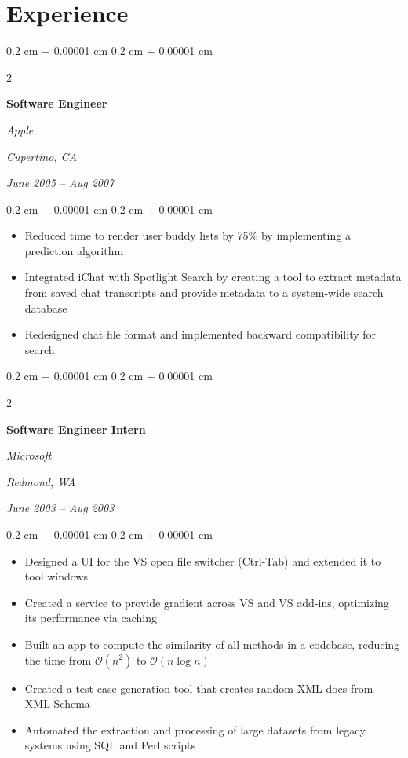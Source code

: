 \documentclass[10pt, letterpaper]{article}
\newenvironment{highlights}{
    \begin{itemize}[
        topsep=0.10 cm,
        parsep=0.10 cm,
        partopsep=0pt,
        itemsep=0pt,
        leftmargin=0.4 cm + 10pt
    ]
}{
    \end{itemize}
} %
\newenvironment{onecolentry}{
    \begin{adjustwidth}{
        0.2 cm + 0.00001 cm
    }{
        0.2 cm + 0.00001 cm
    }
}{
    \end{adjustwidth}
} %
\newenvironment{twocolentry}[2][]{
    \onecolentry
    \def\secondColumn{#2}
    \setcolumnwidth{\fill, 4.5 cm}
    \begin{paracol}{2}
}{
    \switchcolumn \raggedleft \secondColumn
    \end{paracol}
    \endonecolentry
} %
\begin{document}
    \section{Experience}




        \begin{twocolentry}{
        \textit{Cupertino, CA}

        \textit{June 2005 – Aug 2007}}
            \textbf{Software Engineer}

            \textit{Apple}
        \end{twocolentry}

        \vspace{0.10 cm}
        \begin{onecolentry}
            \begin{highlights}
                \item Reduced time to render user buddy lists by 75\% by implementing a prediction algorithm
                \item Integrated iChat with Spotlight Search by creating a tool to extract metadata from saved chat transcripts and provide metadata to a system-wide search database
                \item Redesigned chat file format and implemented backward compatibility for search
            \end{highlights}
        \end{onecolentry}


        \vspace{0.2 cm}

        \begin{twocolentry}{
        \textit{Redmond, WA}

        \textit{June 2003 – Aug 2003}}
            \textbf{Software Engineer Intern}

            \textit{Microsoft}
        \end{twocolentry}

        \vspace{0.10 cm}
        \begin{onecolentry}
            \begin{highlights}
                \item Designed a UI for the VS open file switcher (Ctrl-Tab) and extended it to tool windows
                \item Created a service to provide gradient across VS and VS add-ins, optimizing its performance via caching
                \item Built an app to compute the similarity of all methods in a codebase, reducing the time from $\mathcal{O}(n^2)$ to $\mathcal{O}(n \log n)$
                \item Created a test case generation tool that creates random XML docs from XML Schema
                \item Automated the extraction and processing of large datasets from legacy systems using SQL and Perl scripts
            \end{highlights}
        \end{onecolentry}
\end{document}
